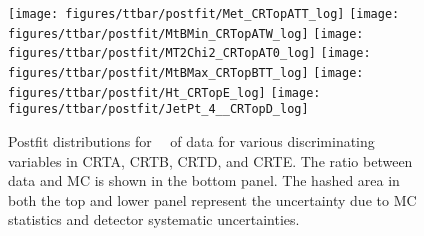 \begin{figure}[htbp]
  \begin{center}
    \texttt{[image: figures/ttbar/postfit/Met\_CRTopATT\_log]} 
    \texttt{[image: figures/ttbar/postfit/MtBMin\_CRTopATW\_log]} 
     \texttt{[image: figures/ttbar/postfit/MT2Chi2\_CRTopAT0\_log]}    
      \texttt{[image: figures/ttbar/postfit/MtBMax\_CRTopBTT\_log]} 
    \texttt{[image: figures/ttbar/postfit/Ht\_CRTopE\_log]} 
    \texttt{[image: figures/ttbar/postfit/JetPt\_4\_\_CRTopD\_log]} 
  \end{center}
  \caption{Postfit distributions for \intlumi\ \ifb\ of data for various discriminating variables in CRTA, CRTB, CRTD, and CRTE.  The ratio between data and MC is shown in the bottom panel. The hashed area in both the top and lower panel represent the uncertainty due to MC statistics and detector systematic uncertainties.}
  \label{fig:CRT}
\end{figure}
\clearpage



